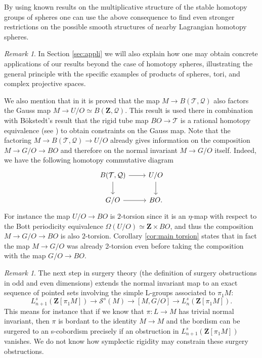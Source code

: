 \documentclass[reqno]{amsart}
\theoremstyle{theorem}
\theoremstyle{remark}
\newtheorem{remark}[corollary]{Remark}
\theoremstyle{definition}
\newcommand{\T}{\mathcal{T}}
\newcommand{\bZ}{\mathbf{Z}}
\newcommand{\Z}{\mathbf{Z}}
\newcommand{\QQ}{\mathcal{Q}}
\renewcommand{\SS}{\mathcal{S}}
\begin{document}
By using known results on the multiplicative structure of the stable homotopy groups of spheres one can use the above consequence to find even stronger restrictions on the possible smooth structures of nearby Lagrangian homotopy spheres.


\begin{remark} In Section \ref{sec:appli} we will also explain how one may obtain concrete applications of our results beyond the case of homotopy spheres,  illustrating the general principle with the specific examples of products of spheres, tori, and complex projective spaces.  \end{remark}


We also mention that in \cite{ACGK} it is proved that the map $M\to B(\T,\QQ)$ also factors
the Gauss map $M\to U/O\simeq B(\Z,\QQ)$. This result is used there in combination with Bökstedt's result that the rigid tube map $BO \to \T$ is a rational
homotopy equivalence (see \cite{B82}) to obtain constraints on the Gauss map.
Note that the factoring $M \to B(\T,\QQ) \to U/O$ already gives information on the composition $M\to G/O \to BO$ and therefore on
the normal invariant $M\to G/O$ itself. Indeed, we have the following homotopy commutative
diagram 
\begin{equation}
\begin{tikzcd}
{B(\T,\QQ)}\arrow[r] \arrow[d] & U/O \arrow[d] \\
G/O \arrow[r] & BO.
\end{tikzcd}
\end{equation}
For instance the map $U/O\to BO$ is $2$-torsion since it is an $\eta$-map with respect to the Bott periodicity equivalence $\Omega (U/O) \simeq \bZ \times BO$, and thus
the composition $M\to G/O\to BO$ is also $2$-torsion. Corollary \ref{cor:main torsion} states that in fact the map $M \to G/O$ was already 2-torsion even before taking the composition with the map $G/O \to BO$.




\begin{remark}\label{rem:next}
The next step in surgery theory (the definition of surgery obstructions in odd and even dimensions)
extends the normal invariant map to an exact sequence of pointed sets involving the simple L-groups associated to $\pi_1 M$:
\[L^s_{n+1}(\Z[\pi_1 M])\to \SS^s(M)\to [M,G/O] \to L^s_n(\Z[\pi_1 M]).\]
This means for instance that if we know that $\pi \colon L \to M$ has trivial normal invariant, then
$\pi$ is bordant to the identity $M\to M$ and the bordism can be surgered to an s-cobordism precisely
if an obstruction in $L^s_{n+1}(\Z[\pi_1 M])$ vanishes.
We do not know how symplectic rigidity may constrain these surgery obstructions. %
\end{remark}
\end{document}
